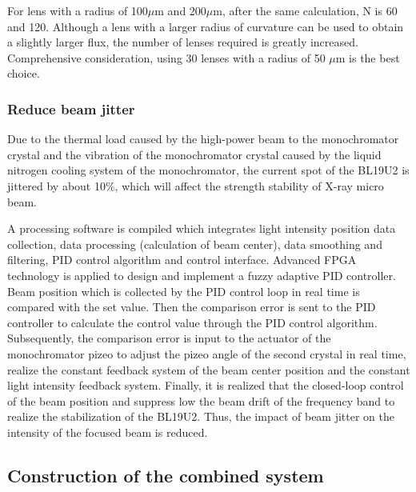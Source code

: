 \documentclass{Head}
\begin{document}
For lens with a radius of 100$\mu$m and 200$\mu$m, after the same calculation, N is 60 and 120.
Although a lens with a larger radius of curvature can be used to obtain a slightly larger flux, the number of lenses required is greatly increased.
Comprehensive consideration, using 30 lenses with a radius of 50 $\mu$m is the best choice.
\subsubsection{Reduce beam jitter}
Due to the thermal load caused by the high-power beam to the monochromator crystal and the vibration of the monochromator crystal caused by the liquid nitrogen cooling system of the monochromator, the current spot of the BL19U2 is jittered by about 10\%, which will affect the strength stability of X-ray micro beam.


A processing software is compiled which integrates light intensity position data collection, data processing (calculation of beam center), data smoothing and filtering, PID control algorithm and control interface.
Advanced FPGA technology is applied to design and implement a fuzzy adaptive PID controller.
Beam position which is collected by the PID control loop in real time is compared with the set value.
Then the comparison error is sent to the PID controller to calculate the control value through the PID control algorithm.
Subsequently, the comparison error is input to the actuator of the monochromator pizeo to adjust the pizeo angle of the second crystal in real time, realize the constant feedback system of the beam center position and the constant light intensity feedback system.
Finally, it is realized that the closed-loop control of the beam position and suppress low the beam drift of the frequency band to realize the stabilization of the BL19U2.
Thus, the impact of beam jitter on the intensity of the focused beam is reduced.
\subsection{Construction of the combined system}
\end{document}
